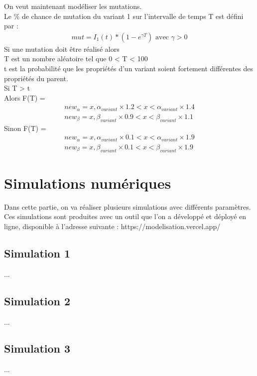 \documentclass{article}
\begin{document}
\noindent
On veut maintenant modéliser les mutations.\\
Le \% de chance de mutation du variant 1 sur l'intervalle de temps T est défini par :
\begin{align}
    mut = I_1(t)*(1-e^{\gamma T})\text{ avec }\gamma > \text{0}
\end{align}
\noindent
Si une mutation doit être réalisé alors \\
\noindent
T est un nombre aléatoire tel que 0 < T < 100 \\
t est la probabilité que les propriétés d'un variant soient fortement différentes des propriétés du parent.\\
Si T > t \\
Alors F(T) = 
\begin{align}
    new_\alpha = x, \alpha_{variant} \times 1.2 < x < \alpha_{variant} \times 1.4 \\
    new_\beta = x, \beta_{variant} \times 0.9 < x < \beta_{variant} \times 1.1
\end{align}
\noindent
Sinon F(T) = \\
\begin{align}
    new_\alpha= x, \alpha_{variant} \times 0.1 < x < \alpha_{variant} \times 1.9 \\
    new_\beta= x, \beta_{variant} \times 0.1 < x < \beta_{variant} \times 1.9
\end{align}


\section{Simulations numériques}

Dans cette partie, on va réaliser plusieurs simulations avec différents paramètres. Ces simulations sont produites avec un outil que l'on a développé et déployé en ligne, disponible à l'adresse suivante : https://modelisation.vercel.app/ \\

\subsection{Simulation 1}
...
\subsection{Simulation 2}
...
\subsection{Simulation 3}
...
\end{document}
